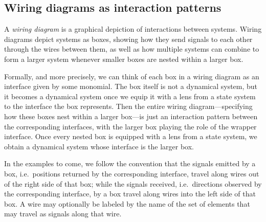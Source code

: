 \documentclass[Book-Poly]{subfiles}
\begin{document}

\subsection{Wiring diagrams as interaction patterns}


A \emph{wiring diagram} is a graphical depiction of interactions between systems.
Wiring diagrams depict systems as boxes, showing how they send signals to each other through the wires between them, as well as how multiple systems can combine to form a larger system whenever smaller boxes are nested within a larger box.


Formally, and more precisely, we can think of each box in a wiring diagram as an interface given by some monomial.
The box itself is not a dynamical system, but it becomes a dynamical system once we equip it with a lens from a state system to the interface the box represents.
Then the entire wiring diagram---specifying how these boxes nest within a larger box---is just an interaction pattern between the corresponding interfaces, with the larger box playing the role of the wrapper interface.
Once every nested box is equipped with a lens from a state system, we obtain a dynamical system whose interface is the larger box.

In the examples to come, we follow the convention that the signals emitted by a box, i.e.\ positions returned by the corresponding interface, travel along wires out of the right side of that box; while the signals received, i.e.\ directions observed by the corresponding interface, by a box travel along wires into the left side of that box.
A wire may optionally be labeled by the name of the set of elements that may travel as signals along that wire.
\end{document}
